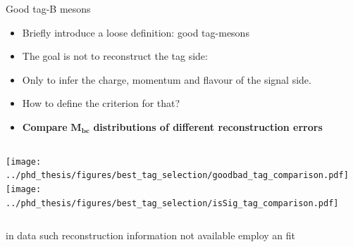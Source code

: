 \documentclass[xcolor=dvipsnames]{beamer}
\begin{document}
\begin{frame}{Good tag-B mesons}
   \centering\scriptsize
   \begin{itemize}
      \item Briefly introduce a loose definition: good tag-\B mesons
      \item The goal is not to reconstruct the tag side:
      \item Only to infer the charge, momentum and flavour of the signal side.
      \item How to define the criterion for that?
      \item[\ra] \textbf{Compare} $\bm{M_{bc}}$ \textbf{distributions of different reconstruction errors}
   \end{itemize}

   \begin{columns}
      \centering
      \texttt{[image: ../phd\_thesis/figures/best\_tag\_selection/goodbad\_tag\_comparison.pdf]}
      \centering
      \texttt{[image: ../phd\_thesis/figures/best\_tag\_selection/isSig\_tag\_comparison.pdf]}
   \end{columns}

   \ra in data such reconstruction information not available
   \ra employ an \Mbc fit

\end{frame}
\end{document}
